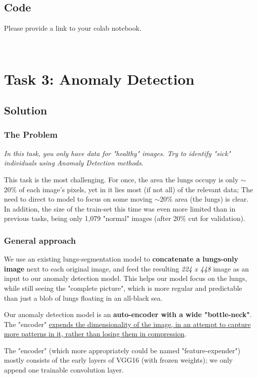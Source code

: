 \documentclass{article}
\begin{document}
\subsection{Code}

Please provide a link to your colab notebook.


\
\section{Task 3: Anomaly Detection}

\subsection{Solution}

\subsubsection{The Problem}
\textit{In this task, you only have data for "healthy" images. Try to identify "sick" individuals using Anomaly Detection methods.}

This task is the most challenging. For once, the area the lungs occupy is only $\sim$20\% of each image's pixels, yet in it lies most (if not all) of the relevant data; The need to direct to model to focus on some moving $\sim$20\% area (the lungs) is clear. In addition, the size of the train-set this time was even more limited than in previous tasks, being only 1,079 "normal" images (after 20\% cut for validation).

\subsubsection{General approach}
We use an existing lungs-segmentation model to \textbf{concatenate a lungs-only image} next to each original image, and feed the resulting \textit{224 x 448} image as an input to our anomaly detection model. This helps our model focus on the lungs, while still seeing the "complete picture", which is more regular and predictable than just a blob of lungs floating in an all-black sea.

Our anomaly detection model is an \textbf{auto-encoder with a wide "bottle-neck"}. The "encoder" \uline{expends the dimensionality of the image, in an attempt to capture more patterns in it, rather than losing them in compression}.

The "encoder" (which more appropriately could be named "feature-expender") mostly consists of the early layers of VGG16 (with frozen weights); we only append one trainable convolution layer.
\end{document}
